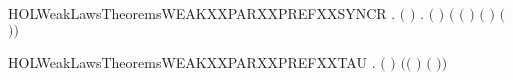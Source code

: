 \newcommand{\HOLWeakLawsTheoremsWEAKXXPARXXPREFXXNOXXSYNCR}{\UseVerbatim{HOLWeakLawsTheoremsWEAKXXPARXXPREFXXNOXXSYNCR}}
\begin{SaveVerbatim}{HOLWeakLawsTheoremsWEAKXXPARXXPREFXXSYNCR}
\HOLTokenTurnstile{} \HOLSymConst{\HOLTokenForall{}} .
       \ensuremath{(} \HOLSymConst{\ensuremath{=}}  \ensuremath{)} \HOLSymConst{\HOLTokenImp{}}
       \HOLSymConst{\HOLTokenForall{}} .
            \ensuremath{(} \HOLSymConst{\ensuremath{\ldotp}} \HOLSymConst{\ensuremath{\mid}}  \HOLSymConst{\ensuremath{\ldotp}}\ensuremath{)}
             \ensuremath{(} \HOLSymConst{\ensuremath{\ldotp}}\ensuremath{(} \HOLSymConst{\ensuremath{\mid}}  \HOLSymConst{\ensuremath{\ldotp}}\ensuremath{)} \HOLSymConst{\ensuremath{+}}
               \HOLSymConst{\ensuremath{\ldotp}}\ensuremath{(} \HOLSymConst{\ensuremath{\ldotp}} \HOLSymConst{\ensuremath{\mid}} \ensuremath{)} \HOLSymConst{\ensuremath{+}} \HOLConst{\ensuremath{\tau}}\HOLSymConst{\ensuremath{\ldotp}}\ensuremath{(} \HOLSymConst{\ensuremath{\mid}} \ensuremath{)}\ensuremath{)}
\end{SaveVerbatim}
\newcommand{\HOLWeakLawsTheoremsWEAKXXPARXXPREFXXSYNCR}{\UseVerbatim{HOLWeakLawsTheoremsWEAKXXPARXXPREFXXSYNCR}}
\begin{SaveVerbatim}{HOLWeakLawsTheoremsWEAKXXPARXXPREFXXTAU}
\HOLTokenTurnstile{} \HOLSymConst{\HOLTokenForall{}}  .
        \ensuremath{(}\HOLSymConst{\ensuremath{\ldotp}} \HOLSymConst{\ensuremath{\mid}} \HOLConst{\ensuremath{\tau}}\HOLSymConst{\ensuremath{\ldotp}}\ensuremath{)} \ensuremath{(}\HOLSymConst{\ensuremath{\ldotp}}\ensuremath{(} \HOLSymConst{\ensuremath{\mid}} \HOLConst{\ensuremath{\tau}}\HOLSymConst{\ensuremath{\ldotp}}\ensuremath{)} \HOLSymConst{\ensuremath{+}} \HOLConst{\ensuremath{\tau}}\HOLSymConst{\ensuremath{\ldotp}}\ensuremath{(}\HOLSymConst{\ensuremath{\ldotp}} \HOLSymConst{\ensuremath{\mid}} \ensuremath{)}\ensuremath{)}
\end{SaveVerbatim}
